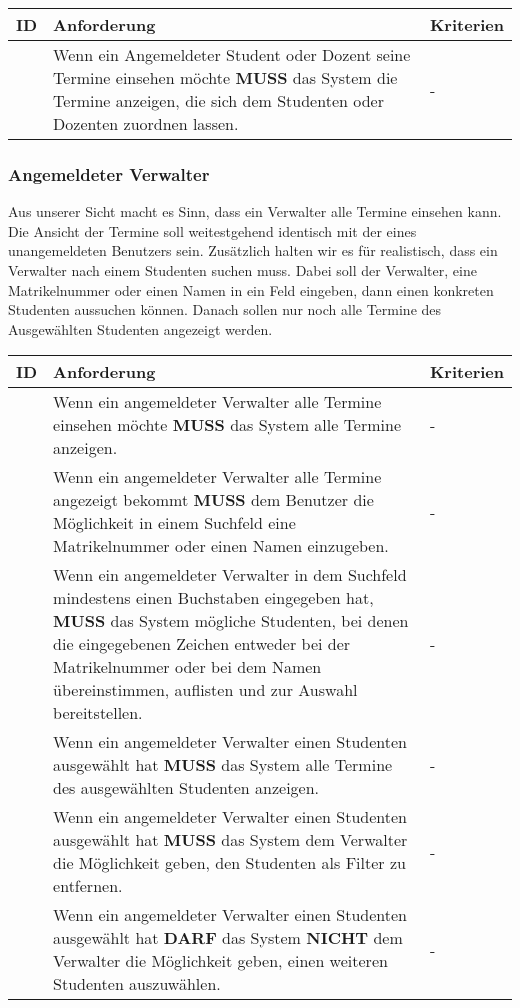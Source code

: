 \vspace{12pt}

\begin{tabular} {|p{}|p{}|p{}|}
	\hline
	ID & Anforderung & Kriterien \\
	\hline
	\printfreqnr
	& Wenn ein Angemeldeter Student oder Dozent seine Termine einsehen möchte \textbf{MUSS} das System die Termine anzeigen, die sich dem Studenten oder Dozenten zuordnen lassen. 
	& - \\
	\hline
\end{tabular}

\newpage

\subsubsection{Angemeldeter Verwalter}
Aus unserer Sicht macht es Sinn, dass ein Verwalter alle Termine einsehen kann. Die Ansicht der Termine soll weitestgehend identisch mit der eines unangemeldeten Benutzers sein. Zusätzlich halten wir es für realistisch, dass ein Verwalter nach einem Studenten suchen muss. Dabei soll der Verwalter, eine Matrikelnummer oder einen Namen in ein Feld eingeben, dann einen konkreten Studenten aussuchen können. Danach sollen nur noch alle Termine des Ausgewählten Studenten angezeigt werden.

\vspace{12pt}

\begin{tabular} {|p{}|p{}|p{}|}
	\hline
	ID & Anforderung & Kriterien \\
	\hline
	\printfreqnr
	& Wenn ein angemeldeter Verwalter alle Termine einsehen möchte \textbf{MUSS} das System alle Termine anzeigen. 
	& - \\
	\hline
	\printfreqnr
	& Wenn ein angemeldeter Verwalter alle Termine angezeigt bekommt \textbf{MUSS} dem Benutzer die Möglichkeit in einem Suchfeld eine Matrikelnummer oder einen Namen einzugeben. 
	& - \\
	\hline
	\printfreqnr
	& Wenn ein angemeldeter Verwalter in dem Suchfeld mindestens einen Buchstaben eingegeben hat, \textbf{MUSS} das System mögliche Studenten, bei denen die eingegebenen Zeichen entweder bei der Matrikelnummer oder bei dem Namen übereinstimmen, auflisten und zur Auswahl bereitstellen. 
	& - \\
	\hline
	\printfreqnr
	& Wenn ein angemeldeter Verwalter einen Studenten ausgewählt hat \textbf{MUSS} das System alle Termine des ausgewählten Studenten anzeigen. 
	& - \\
	\hline
	\printfreqnr
	& Wenn ein angemeldeter Verwalter einen Studenten ausgewählt hat \textbf{MUSS} das System dem Verwalter die Möglichkeit geben, den Studenten als Filter zu entfernen. 
	& - \\
	\hline
	\printfreqnr
	& Wenn ein angemeldeter Verwalter einen Studenten ausgewählt hat \textbf{DARF} das System \textbf{NICHT} dem Verwalter die Möglichkeit geben, einen weiteren Studenten auszuwählen. 
	& - \\
	\hline
\end{tabular}


